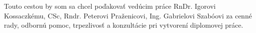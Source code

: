 \indent Touto cestou by som sa chcel poďakovať vedúcim práce RnDr. Igorovi Kossaczkému, CSc, Rndr. Peterovi Praženicovi, Ing. Gabrielovi Szabóovi za cenné rady, odbornú pomoc, trpezlivosť a konzultácie pri vytvorení diplomovej práce.
